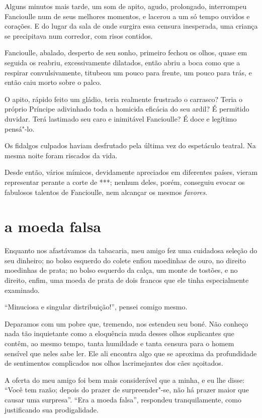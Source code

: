 Alguns minutos mais tarde, um som de apito, agudo, prolongado, interrompeu
Fancioulle num de seus melhores momentos, e lacerou a um só tempo
ouvidos e corações. E do lugar da sala de onde surgira essa
censura inesperada, uma criança se precipitava num corredor, com
risos contidos.

Fancioulle, abalado, desperto de seu sonho, primeiro fechou os olhos,
quase em seguida os reabriu, excessivamente dilatados, então abriu a
boca como que a respirar convulsivamente, titubeou um pouco para
frente, um pouco para trás, e então caiu morto sobre o palco.

O apito, rápido feito um gládio, teria realmente frustrado o carrasco?
Teria o próprio Príncipe adivinhado toda a homicida eficácia do seu
ardil? É permitido duvidar. Terá lastimado seu caro e inimitável
Fancioulle? É doce e legítimo pensá"-lo.

Os fidalgos culpados haviam desfrutado pela última vez do espetáculo
teatral. Na mesma noite foram riscados da vida.

Desde então, vários mímicos, devidamente apreciados em diferentes
países, vieram representar perante a corte de ***; nenhum deles, porém,
conseguiu evocar os fabulosos talentos de Fancioulle, nem alcançar
os mesmos \textit{favores}. 

\quebra\section[A moeda falsa]{a moeda falsa}

Enquanto nos afastávamos da tabacaria, meu amigo fez uma cuidadosa
seleção do seu dinheiro; no bolso esquerdo do colete enfiou
moedinhas de ouro, no direito moedinhas de prata; no bolso esquerdo da calça, um monte de tostões, e no direito, enfim, uma moeda de prata
de dois francos que ele tinha especialmente examinado.

``Minuciosa e singular distribuição!'', pensei
comigo mesmo.

Deparamos com um pobre que, tremendo, nos estendeu seu boné. Não
conheço nada tão inquietante como a eloquência muda desses olhos
suplicantes que contêm, ao mesmo tempo, tanta humildade e tanta censura para o homem sensível que neles
sabe ler. Ele ali encontra algo que se
aproxima da profundidade de sentimentos complicados nos olhos
lacrimejantes dos cães açoitados.

A oferta do meu amigo foi bem mais considerável que a minha, e eu lhe
disse: ``Você tem razão; depois do prazer de
surpreender"-se, não há prazer maior que causar uma surpresa''. 
``Era a moeda falsa'', respondeu tranquilamente, como justificando sua prodigalidade.

